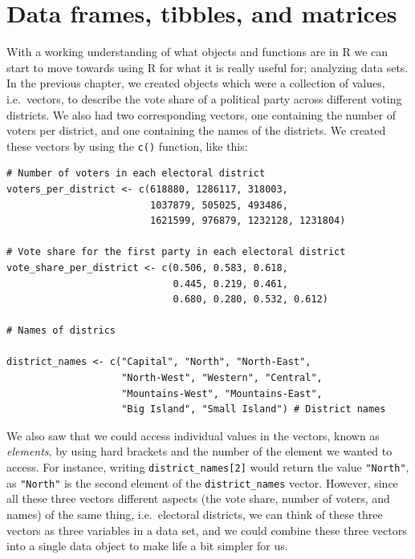 \documentclass[
]{book}
\begin{document}
\hypertarget{data-frames-tibbles-and-matrices}{%
\chapter{Data frames, tibbles, and matrices}\label{data-frames-tibbles-and-matrices}}

With a working understanding of what objects and functions are in R we can start to move towards using R for what it is really useful for; analyzing data sets. In the previous chapter, we created objects which were a collection of values, i.e.~vectors, to describe the vote share of a political party across different voting districts. We also had two corresponding vectors, one containing the number of voters per district, and one containing the names of the districts. We created these vectors by using the \texttt{c()} function, like this:

\begin{verbatim}
# Number of voters in each electoral district
voters_per_district <- c(618880, 1286117, 318003, 
                         1037879, 505025, 493486, 
                         1621599, 976879, 1232128, 1231804) 

# Vote share for the first party in each electoral district
vote_share_per_district <- c(0.506, 0.583, 0.618, 
                             0.445, 0.219, 0.461, 
                             0.680, 0.280, 0.532, 0.612) 
                             
# Names of districs

district_names <- c("Capital", "North", "North-East",
                    "North-West", "Western", "Central",
                    "Mountains-West", "Mountains-East",
                    "Big Island", "Small Island") # District names
\end{verbatim}

We also saw that we could access individual values in the vectors, known as \emph{elements}, by using hard brackets and the number of the element we wanted to access. For instance, writing \texttt{district\_names{[}2{]}} would return the value \texttt{"North"}, as \texttt{"North"} is the second element of the \texttt{district\_names} vector. However, since all these three vectors different aspects (the vote share, number of voters, and names) of the same thing, i.e.~electoral districts, we can think of these three vectors as three variables in a data set, and we could combine these three vectors into a single data object to make life a bit simpler for us.
\end{document}
